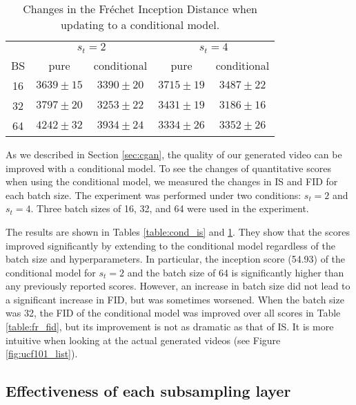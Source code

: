 \documentclass[twocolumn]{svjour3}
\def\Fig#1{Figure \ref{fig:#1}}
\def\Table#1{Table \ref{table:#1}}
\def\Sec#1{Section \ref{sec:#1}}
\begin{document}
\begin{table}
\centering
{\renewcommand{\arraystretch}{1.2}
\begin{tabular}{c|cc|cc}
& \multicolumn{2}{|c|}{$s_t = 2$} & \multicolumn{2}{|c}{$s_t = 4$} \\ \cline{2-5}
BS & pure & conditional & pure & conditional \\ \hline \hline
16 & {$3639 \pm 15$} & {$3390 \pm 20$} & ${3715 \pm 19}$ & {$3487 \pm 22$} \\
32 & {$3797 \pm 20$} & {$3253 \pm 22$} & ${3431 \pm 19}$ & {$3186 \pm 16$} \\
64 & ${4242 \pm 32}$ & {$3934 \pm 24$} & ${3334 \pm 26}$ & {$3352 \pm 26$} \\ \hline
\end{tabular}
}
\caption{Changes in the Fr\'echet Inception Distance when updating to a conditional model.}
\label{table:cond_fid}
\end{table}





As we described in \Sec{cgan}, the quality of our generated video
can be improved with a conditional model.
To see the changes of quantitative scores when using the conditional model,
we measured the changes in IS and FID for each batch size.
The experiment was performed under two conditions: $s_t = 2$ and $s_t = 4$.
Three batch sizes of 16, 32, and 64 were used in the experiment.

The results are shown in Tables \ref{table:cond_is} and \ref{table:cond_fid}.
They show that the scores improved significantly by extending to the conditional model
regardless of the batch size and hyperparameters.
In particular, the inception score (54.93) of the conditional model for $s_t = 2$
and the batch size of 64 is significantly higher than any previously reported scores.
However, an increase in batch size did not lead to a significant increase in FID,
but was sometimes worsened.
When the batch size was 32, the FID of the conditional model was improved
over all scores in \Table{fr_fid},
but its improvement is not as dramatic as that of IS.
It is more intuitive when looking at the actual generated videos (see \Fig{ucf101_list}).


\subsection{Effectiveness of each subsampling layer}
\end{document}
